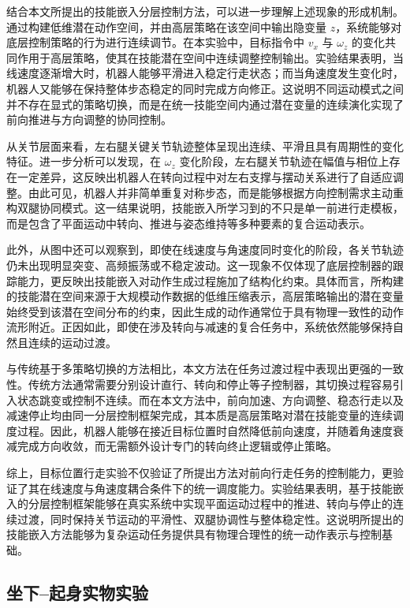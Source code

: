 结合本文所提出的技能嵌入分层控制方法，可以进一步理解上述现象的形成机制。通过构建低维潜在动作空间，并由高层策略在该空间中输出隐变量 \(z\)，系统能够对底层控制策略的行为进行连续调节。在本实验中，目标指令中 \(v_x\) 与 \(\omega_z\) 的变化共同作用于高层策略，使其在技能潜在空间中连续调整控制输出。实验结果表明，当线速度逐渐增大时，机器人能够平滑进入稳定行走状态；而当角速度发生变化时，机器人又能够在保持整体步态稳定的同时完成方向修正。这说明不同运动模式之间并不存在显式的策略切换，而是在统一技能空间内通过潜在变量的连续演化实现了前向推进与方向调整的协同控制。

从关节层面来看，左右腿关键关节轨迹整体呈现出连续、平滑且具有周期性的变化特征。进一步分析可以发现，在 \(\omega_z\) 变化阶段，左右腿关节轨迹在幅值与相位上存在一定差异，这反映出机器人在转向过程中对左右支撑与摆动关系进行了自适应调整。由此可见，机器人并非简单重复对称步态，而是能够根据方向控制需求主动重构双腿协同模式。这一结果说明，技能嵌入所学习到的不只是单一前进行走模板，而是包含了平面运动中转向、推进与姿态维持等多种要素的复合运动表示。

此外，从图中还可以观察到，即使在线速度与角速度同时变化的阶段，各关节轨迹仍未出现明显突变、高频振荡或不稳定波动。这一现象不仅体现了底层控制器的跟踪能力，更反映出技能嵌入对动作生成过程施加了结构化约束。具体而言，所构建的技能潜在空间来源于大规模动作数据的低维压缩表示，高层策略输出的潜在变量始终受到该潜在空间分布的约束，因此生成的动作通常位于具有物理一致性的动作流形附近。正因如此，即使在涉及转向与减速的复合任务中，系统依然能够保持自然且连续的运动过渡。

与传统基于多策略切换的方法相比，本文方法在任务过渡过程中表现出更强的一致性。传统方法通常需要分别设计直行、转向和停止等子控制器，其切换过程容易引入状态跳变或控制不连续。而在本文方法中，前向加速、方向调整、稳态行走以及减速停止均由同一分层控制框架完成，其本质是高层策略对潜在技能变量的连续调度过程。因此，机器人能够在接近目标位置时自然降低前向速度，并随着角速度衰减完成方向收敛，而无需额外设计专门的转向终止逻辑或停止策略。

综上，目标位置行走实验不仅验证了所提出方法对前向行走任务的控制能力，更验证了其在线速度与角速度耦合条件下的统一调度能力。实验结果表明，基于技能嵌入的分层控制框架能够在真实系统中实现平面运动过程中的推进、转向与停止的连续过渡，同时保持关节运动的平滑性、双腿协调性与整体稳定性。这说明所提出的技能嵌入方法能够为复杂运动任务提供具有物理合理性的统一动作表示与控制基础。



\subsection{坐下--起身实物实验}


